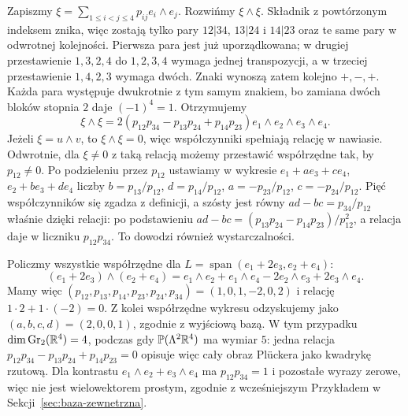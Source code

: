 \begin{przyklad}
Zapiszmy $\xi=\sum_{1\leq i<j\leq4}p_{ij}e_i\wedge e_j$.
Rozwińmy $\xi\wedge\xi$. Składnik z powtórzonym
indeksem znika, więc zostają tylko pary $12|34$, $13|24$
i $14|23$ oraz te same pary w odwrotnej kolejności.
Pierwsza para jest już uporządkowana; w drugiej
przestawienie $1,3,2,4$ do $1,2,3,4$ wymaga jednej
transpozycji, a w trzeciej przestawienie $1,4,2,3$
wymaga dwóch. Znaki wynoszą zatem kolejno $+,-,+$.
Każda para występuje dwukrotnie z tym samym znakiem,
bo zamiana dwóch bloków stopnia $2$ daje $(-1)^4=1$.
Otrzymujemy
\begin{equation}\label{eq:plucker-24}
 \xi\wedge\xi=
 2(p_{12}p_{34}-p_{13}p_{24}+p_{14}p_{23})
   e_1\wedge e_2\wedge e_3\wedge e_4.
\end{equation}
Jeżeli $\xi=u\wedge v$, to $\xi\wedge\xi=0$,
więc współczynniki spełniają relację w nawiasie.
Odwrotnie, dla $\xi\ne0$ z taką relacją możemy
przestawić współrzędne tak, by $p_{12}\ne0$.
Po podzieleniu przez $p_{12}$ ustawiamy w wykresie
$e_1+ae_3+ce_4$, $e_2+be_3+de_4$ liczby
$b=p_{13}/p_{12}$, $d=p_{14}/p_{12}$,
$a=-p_{23}/p_{12}$, $c=-p_{24}/p_{12}$.
Pięć współczynników się zgadza z definicji,
a szósty jest równy $ad-bc=p_{34}/p_{12}$
właśnie dzięki relacji: po podstawieniu
$ad-bc=(p_{13}p_{24}-p_{14}p_{23})/p_{12}^2$,
a relacja daje w liczniku $p_{12}p_{34}$.
To dowodzi również
wystarczalności.

Policzmy wszystkie współrzędne dla
$L=\operatorname{span}(e_1+2e_3,e_2+e_4)$:
\[
 (e_1+2e_3)\wedge(e_2+e_4)
  =e_1\wedge e_2+e_1\wedge e_4
   -2e_2\wedge e_3+2e_3\wedge e_4.
\]
Mamy więc $(p_{12},p_{13},p_{14},p_{23},p_{24},p_{34})
=(1,0,1,-2,0,2)$ i relację $1\cdot2+1\cdot(-2)=0$.
Z kolei współrzędne wykresu odzyskujemy jako
$(a,b,c,d)=(2,0,0,1)$, zgodnie z wyjściową bazą.
W tym przypadku $\dim\operatorname{Gr}_2(\mathbb{R}^4)=4$,
podczas gdy $\mathbb P(\Lambda^2\mathbb{R}^4)$ ma wymiar $5$:
jedna relacja $p_{12}p_{34}-p_{13}p_{24}+p_{14}p_{23}=0$
opisuje więc cały obraz Plückera jako kwadrykę rzutową.
Dla kontrastu
$e_1\wedge e_2+e_3\wedge e_4$ ma
$p_{12}p_{34}=1$ i pozostałe wyrazy zerowe,
więc nie jest wielowektorem prostym, zgodnie
z wcześniejszym Przykładem w
Sekcji~\ref{sec:baza-zewnetrzna}.
\end{przyklad}

